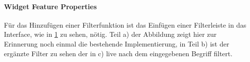 \newpage
\paragraph{Widget Feature Properties}
Für das Hinzufügen einer Filterfunktion ist das Einfügen einer Filterleiste in das Interface, wie in \cref{fig:FeatureProperty_Adaption} zu sehen, nötig.
Teil a) der Abbildung zeigt hier zur Erinnerung noch einmal die bestehende Implementierung, in Teil b) ist der ergänzte Filter zu sehen der in c) live nach dem eingegebenen Begriff filtert.

\begin{figure}[H]
  \centering
  \qquad
 \qquad
  \label{fig:FeatureProperty_Adaption}
\end{figure}

